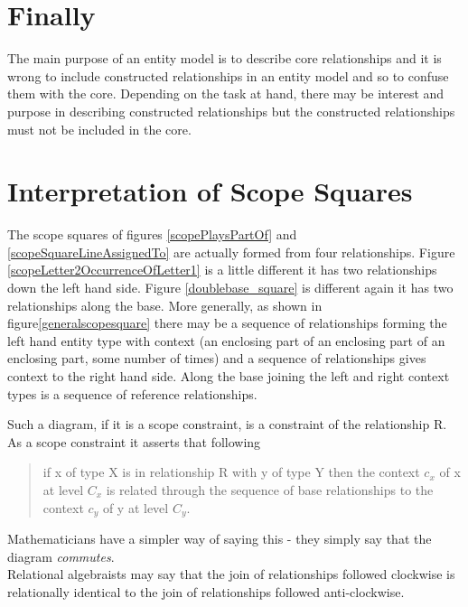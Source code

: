 \section{Finally}
\noindent The main purpose of an entity model is to describe core relationships and it is wrong to include constructed relationships in an entity model and so to confuse them with the core. Depending on the task at hand, there may be interest and purpose in describing constructed relationships but the constructed relationships must not be included in the core. \\


\section{Interpretation of Scope Squares}

The scope squares of figures \ref{scopePlaysPartOf} and \ref{scopeSquareLineAssignedTo} are actually formed from four relationships. Figure \ref{scopeLetter2OccurrenceOfLetter1} is a little different it has two relationships down the left hand side.
Figure \ref{doublebase_square} is different again it has two relationships along the base. More generally, as shown in figure\ref{generalscopesquare} there may be a sequence of relationships forming the left hand entity type with context (an enclosing part of an enclosing part of an enclosing part, some number of times)
and a sequence of relationships gives context to the right hand side. Along the base joining the left and right context types is a sequence of reference relationships.


\noindent Such a diagram, if it is a scope constraint, is a constraint of the relationship R. As a scope constraint it asserts that following 
\begin{quote}
if x of type X is in relationship R with y of type Y then the context $c_x$ of x at level $C_x$ is related through the sequence of base relationships to the context $c_y$ of y at level $C_y$.
\end{quote}

 \noindent Mathematicians have a simpler way of saying this - they simply say that the diagram \emph{commutes}.  \\

\noindent Relational algebraists may say that the join of relationships followed clockwise is relationally identical to the join of relationships followed anti-clockwise.  \\

